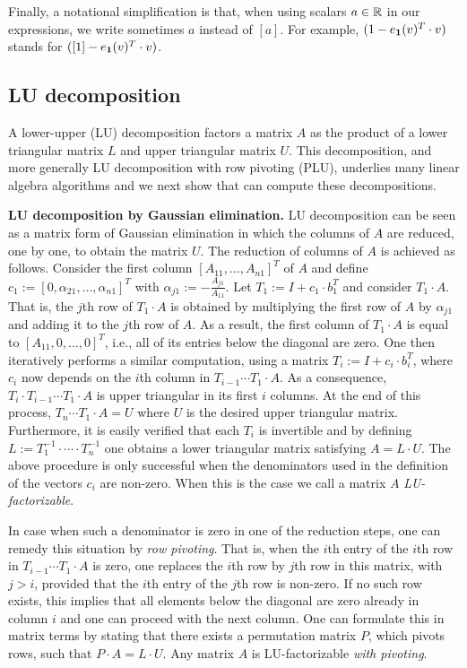 Finally, a notational simplification is that, when using scalars $a\in\mathbb{R}$ in our expressions, we write sometimes
$a$ instead of $[a]$. For example,  $(1-e_{\mathbf{1}}(v)^T\cdot v)$ stands for  $([1]-e_{\mathbf{1}}(v)^T\cdot v)$.

\subsection{LU decomposition}
A lower-upper (LU) decomposition factors a matrix $A$ as the product of a lower triangular matrix $L$ and upper triangular matrix $U$.  
This decomposition, and more generally LU decomposition with row pivoting (PLU),  underlies many linear algebra algorithms and 
we next show that \langfor can compute these decompositions.

\smallskip
\noindent
\textbf{LU decomposition by Gaussian elimination.} LU decomposition can be seen as a matrix form of Gaussian elimination in which the columns of $A$
are reduced, one by one, to obtain the matrix $U$. The reduction of columns of $A$ is achieved
as follows. Consider the first column $[A_{11},\ldots,A_{n1}]^T$ of $A$ and  define 
$c_1 := [0, \alpha_{21},\ldots, \alpha_{n1}]^T$ 
with $\alpha_{j1} := -\frac{A_{j1}}{A_{11}}$. Let $T_1:=I+ c_1\cdot b_1^T$ and consider
$T_1\cdot A$. That is, the $j$th row of $T_1\cdot A$ is obtained by multiplying the first row of $A$ by $\alpha_{j1}$ and adding it to the $j$th row of $A$. As a result, the first column of $T_1\cdot A$ is equal to $[A_{11},0,\ldots,0]^T$, i.e., 
all of its entries below the diagonal are zero.  One then iteratively performs a similar computation, using a matrix $T_i:=I+c_i\cdot b_i^T$, where $c_i$ now depends on the $i$th column in $T_{i-1}\cdots T_1\cdot A$. As a consequence, $T_i\cdot T_{i-1}\cdots T_1\cdot A$ is upper triangular
in its first $i$ columns. At the end of this process, $T_n\cdots T_1\cdot A=U$ where $U$ is the desired upper triangular matrix.
Furthermore, it is easily verified that each $T_i$ is invertible and by defining $L:=T_1^{-1}\cdot\cdots\cdot T_n^{-1}$ one obtains a lower triangular matrix satisfying $A=L\cdot U$. The above procedure is only successful when the denominators used in the definition of the vectors $c_i$ are non-zero. When this is the case we call a matrix $A$ \textit{LU-factorizable}. 

In case when such a denominator is zero in one of the reduction steps, one can remedy this situation by \textit{row pivoting}. That is, when the $i$th entry of the
$i$th row in $T_{i-1}\cdots T_1\cdot A$ is zero, one replaces the $i$th row by  $j$th row in this matrix, with $j>i$, provided that the $i$th entry of the $j$th row is non-zero. If no such row exists, this implies that all elements below the diagonal are zero already in column $i$ and one can proceed with the next column. One can formulate this in matrix terms by stating that there exists a permutation matrix $P$, which pivots rows, such that $P\cdot A=L\cdot U$. Any matrix $A$ is LU-factorizable \textit{with pivoting}.

